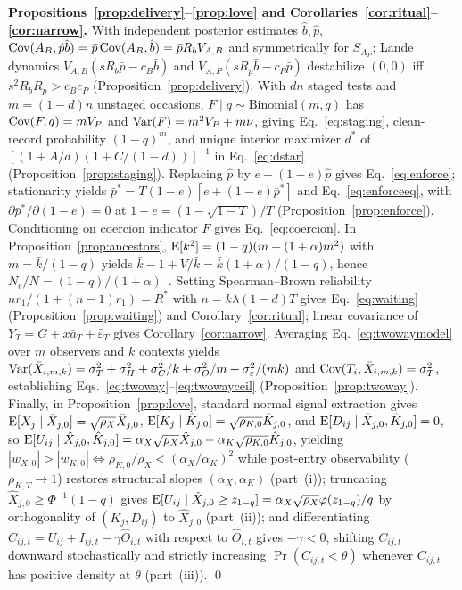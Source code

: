 \noindent\textbf{Propositions~\ref{prop:delivery}--\ref{prop:love} and Corollaries~\ref{cor:ritual}--\ref{cor:narrow}.} With independent posterior estimates $\hat b,\hat p$, $\operatorname{Cov}(A_B,\hat p\hat b)=\bar p\operatorname{Cov}(A_B,\hat b)=\bar pR_bV_{A,B}$ and symmetrically for $S_{A_P}$; Lande dynamics $V_{A,B}(sR_b\bar p-c_B\bar b)$ and $V_{A,P}(sR_p\bar b-c_P\bar p)$ destabilize $(0,0)$ iff $s^2R_bR_p>c_Bc_P$ (Proposition~\ref{prop:delivery}). With $dn$ staged tests and $m=(1-d)n$ unstaged occasions, $F\mid q\sim\mathrm{Binomial}(m,q)$ has $\operatorname{Cov}(F,q)=mV_P$ and $\operatorname{Var}(F)=m^2V_P+m\nu$, giving Eq.~\eqref{eq:staging}, clean-record probability $(1-q)^m$, and unique interior maximizer $d^*$ of $[(1+A/d)(1+C/(1-d))]^{-1}$ in Eq.~\eqref{eq:dstar} (Proposition~\ref{prop:staging}). Replacing $\hat p$ by $e+(1-e)\hat p$ gives Eq.~\eqref{eq:enforce}; stationarity yields $\bar p^*=T(1-e)[e+(1-e)\bar p^*]$ and Eq.~\eqref{eq:enforceeq}, with $\partial\bar p^*/\partial(1-e)=0$ at $1-e=(1-\sqrt{1-T})/T$ (Proposition~\ref{prop:enforce}). Conditioning on coercion indicator $F$ gives Eq.~\eqref{eq:coercion}. In Proposition~\ref{prop:ancestors}, $\operatorname{E}[k^2]=(1-q)(m+(1+\alpha)m^2)$ with $m=\bar k/(1-q)$ yields $\bar k-1+V/\bar k=\bar k(1+\alpha)/(1-q)$, hence $N_e/N=(1-q)/(1+\alpha)$~\cite{kimura1963}. Setting Spearman--Brown reliability $nr_1/(1+(n-1)r_1)=R^*$ with $n=k\lambda(1-d)T$ gives Eq.~\eqref{eq:waiting} (Proposition~\ref{prop:waiting}) and Corollary~\ref{cor:ritual}; linear covariance of $Y_T=G+x\bar a_T+\bar\varepsilon_T$ gives Corollary~\ref{cor:narrow}. Averaging Eq.~\eqref{eq:twowaymodel} over $m$ observers and $k$ contexts yields $\operatorname{Var}(\bar X_{i,m,k})=\sigma_T^2+\sigma_H^2+\sigma_C^2/k+\sigma_O^2/m+\sigma_\varepsilon^2/(mk)$ and $\operatorname{Cov}(T_i,\bar X_{i,m,k})=\sigma_T^2$, establishing Eqs.~\eqref{eq:twoway}--\eqref{eq:twowayceil} (Proposition~\ref{prop:twoway}). Finally, in Proposition~\ref{prop:love}, standard normal signal extraction gives $\operatorname{E}[X_j\mid\hat X_{j,0}]=\sqrt{\rho_X}\hat X_{j,0}$, $\operatorname{E}[K_j\mid\hat K_{j,0}]=\sqrt{\rho_{K,0}}\hat K_{j,0}$, and $\operatorname{E}[D_{ij}\mid\hat X_{j,0},\hat K_{j,0}]=0$, so $\operatorname{E}[U_{ij}\mid\hat X_{j,0},\hat K_{j,0}]=\alpha_X\sqrt{\rho_X}\hat X_{j,0}+\alpha_K\sqrt{\rho_{K,0}}\hat K_{j,0}$, yielding $|w_{X,0}|>|w_{K,0}|\iff\rho_{K,0}/\rho_X<(\alpha_X/\alpha_K)^2$ while post-entry observability ($\rho_{K,T}\to 1$) restores structural slopes $(\alpha_X,\alpha_K)$ (part~(i)); truncating $\hat X_{j,0}\ge\Phi^{-1}(1-q)$ gives $\operatorname{E}[U_{ij}\mid\hat X_{j,0}\ge z_{1-q}]=\alpha_X\sqrt{\rho_X}\varphi(z_{1-q})/q$ by orthogonality of $(K_j,D_{ij})$ to $\hat X_{j,0}$ (part~(ii)); and differentiating $C_{ij,t}=U_{ij}+I_{ij,t}-\gamma\widehat O_{i,t}$ with respect to $\widehat O_{i,t}$ gives $-\gamma<0$, shifting $C_{ij,t}$ downward stochastically and strictly increasing $\Pr(C_{ij,t}<\theta)$ whenever $C_{ij,t}$ has positive density at $\theta$ (part~(iii)). \qed

